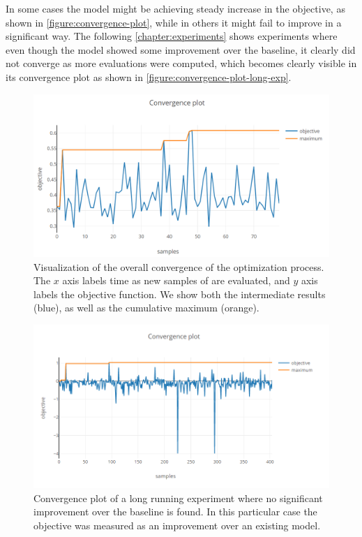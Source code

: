 In some cases the model might be achieving steady increase in the objective, as shown in \autoref{figure:convergence-plot}, while in others it might fail to improve in a significant way. The following \autoref{chapter:experiments} shows experiments where even though the model showed some improvement over the baseline, it clearly did not converge as more evaluations were computed, which becomes clearly visible in its convergence plot as shown in \autoref{figure:convergence-plot-long-exp}.

\begin{figure}
	\begin{center}
		\includegraphics[width=1.0\textwidth]{images/convergence-plot.png}
		\caption{Visualization of the overall convergence of the optimization process. The $x$ axis labels time as new samples of are evaluated, and $y$ axis labels the objective function. We show both the intermediate results (blue), as well as the cumulative maximum (orange).}
	\end{center}
\end{figure}
\label{figure:convergence-plot}

\begin{figure}
	\begin{center}
		\includegraphics[width=1.0\textwidth]{images/convergence-plot-long-exp.png}
		\caption{Convergence plot of a long running experiment where no significant improvement over the baseline is found. In this particular case the objective was measured as an improvement over an existing model.}
	\end{center}
\end{figure}
\label{figure:convergence-plot-long-exp}